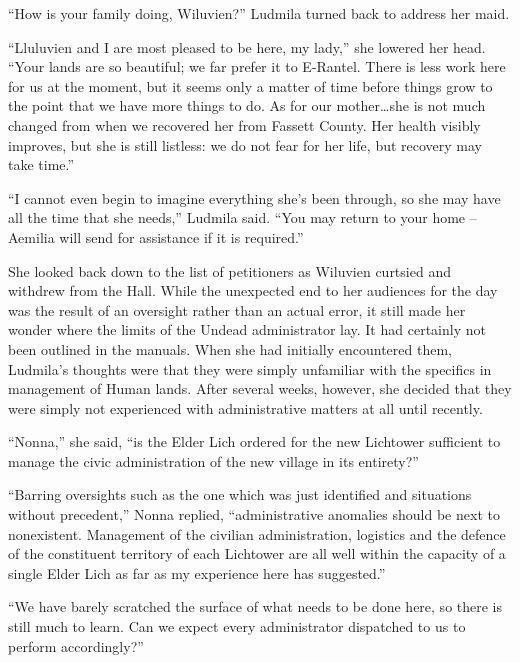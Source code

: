  

“How is your family doing, Wiluvien?” Ludmila turned back to address her maid.

 

“Lluluvien and I are most pleased to be here, my lady,” she lowered her head. “Your lands are so beautiful; we far prefer it to E-Rantel. There is less work here for us at the moment, but it seems only a matter of time before things grow to the point that we have more things to do. As for our mother…she is not much changed from when we recovered her from Fassett County. Her health visibly improves, but she is still listless: we do not fear for her life, but recovery may take time.”

 

“I cannot even begin to imagine everything she’s been through, so she may have all the time that she needs,” Ludmila said. “You may return to your home – Aemilia will send for assistance if it is required.”

 

She looked back down to the list of petitioners as Wiluvien curtsied and withdrew from the Hall. While the unexpected end to her audiences for the day was the result of an oversight rather than an actual error, it still made her wonder where the limits of the Undead administrator lay. It had certainly not been outlined in the manuals. When she had initially encountered them, Ludmila’s thoughts were that they were simply unfamiliar with the specifics in management of Human lands. After several weeks, however, she decided that they were simply not experienced with administrative matters at all until recently.

 

“Nonna,” she said, “is the Elder Lich ordered for the new Lichtower sufficient to manage the civic administration of the new village in its entirety?”

 

“Barring oversights such as the one which was just identified and situations without precedent,” Nonna replied, “administrative anomalies should be next to nonexistent. Management of the civilian administration, logistics and the defence of the constituent territory of each Lichtower are all well within the capacity of a single Elder Lich as far as my experience here has suggested.”

 

“We have barely scratched the surface of what needs to be done here, so there is still much to learn. Can we expect every administrator dispatched to us to perform accordingly?”

